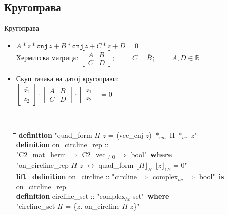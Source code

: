 \documentclass[slidestop, compress, mathserif, containsverbatim, xcolor=dvipsnames]{beamer}
\newcommand{\Repnzv}[1]{\ensuremath{\lfloor#1\rfloor_{C2}}}
\newcommand{\Repcm}[1]{\ensuremath{\lfloor#1\rfloor_{H}}}
\begin{document}
\subsection*{Кругоправа}

\begin{frame}{Кругоправа}
  \begin{itemize}
  \item $A*z*\mathtt{cnj}\,z + B*\mathtt{cnj}\,z + C*z + D = 0$ \\
        Хермитска матрица: $\begin{bmatrix} A & B \\ C & D\end{bmatrix}$;\ \ \ \ \ $C = \bar{B}$;\ \ \ \ \ $A, D \in \mathbb{R}$ \vfill
  \item Скуп тачака на датој кругоправи: \\
    $\begin{bmatrix} \bar{z_1} \\ \bar{z_2} \end{bmatrix} \cdot \begin{bmatrix} A & B \\ C & D\end{bmatrix} \cdot \begin{bmatrix} z_1 \\ z_2 \end{bmatrix} = 0$
    \begin{footnotesize} {\tt
        \begin{tabbing}
          \hspace{5mm}\=\hspace{5mm}\=\hspace{5mm}\=\hspace{5mm}\=\hspace{5mm}\=\kill
          {\bf definition} "{}quad\_form $H$ $z$ = (vec\_cnj $z$) $*_{vm}$ H $*_{vv}$ $z$"\\
          {\bf definition} on\_circline\_rep :: \\
          \> "{}C2\_mat\_herm $\Rightarrow$ C2\_vec$_{\neq 0}$ $\Rightarrow$ bool"\ {\bf where}\\
          \>"{}on\_circline\_rep $H$ $z$ $\longleftrightarrow$ quad\_form $\Repcm{H}$ $\Repnzv{z}$ = 0"\\
          {\bf lift\_definition} on\_circline :: "{}circline $\Rightarrow$ complex$_{hc}$ $\Rightarrow$ bool"\ {\bf is}\\
          \> on\_circline\_rep\\
          {\bf definition} circline\_set :: "{}complex$_{hc}$ set"\ {\bf where} \\
          \>"{}circline\_set $H$ = \{$z$. on\_circline $H$ $z$\}"
        \end{tabbing}
    } \end{footnotesize}
  \end{itemize}
\end{frame}
\end{document}
